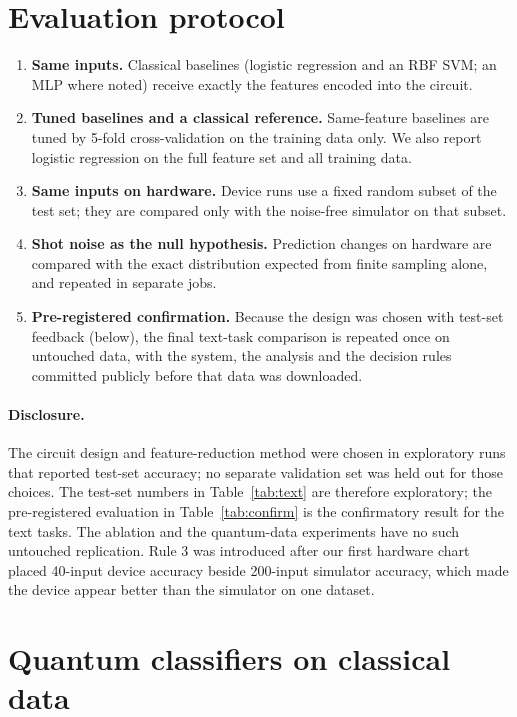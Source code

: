 \documentclass[11pt]{article}
\begin{document}
\section{Evaluation protocol}\label{sec:protocol}
\begin{enumerate}
  \item \textbf{Same inputs.} Classical baselines (logistic regression and an RBF SVM; an MLP where noted) receive exactly the features encoded into the circuit.
  \item \textbf{Tuned baselines and a classical reference.} Same-feature baselines are tuned by 5-fold cross-validation on the training data only. We also report logistic regression on the full feature set and all training data.
  \item \textbf{Same inputs on hardware.} Device runs use a fixed random subset of the test set; they are compared only with the noise-free simulator on that subset.
  \item \textbf{Shot noise as the null hypothesis.} Prediction changes on hardware are compared with the exact distribution expected from finite sampling alone, and repeated in separate jobs.
  \item \textbf{Pre-registered confirmation.} Because the design was chosen with test-set feedback (below), the final text-task comparison is repeated once on untouched data, with the system, the analysis and the decision rules committed publicly before that data was downloaded.
\end{enumerate}
\paragraph{Disclosure.} The circuit design and feature-reduction method were chosen in exploratory runs that reported test-set accuracy; no separate validation set was held out for those choices. The test-set numbers in Table~\ref{tab:text} are therefore exploratory; the pre-registered evaluation in Table~\ref{tab:confirm} is the confirmatory result for the text tasks. The ablation and the quantum-data experiments have no such untouched replication. Rule 3 was introduced after our first hardware chart placed 40-input device accuracy beside 200-input simulator accuracy, which made the device appear better than the simulator on one dataset.

\section{Quantum classifiers on classical data}\label{sec:classical}
\end{document}
